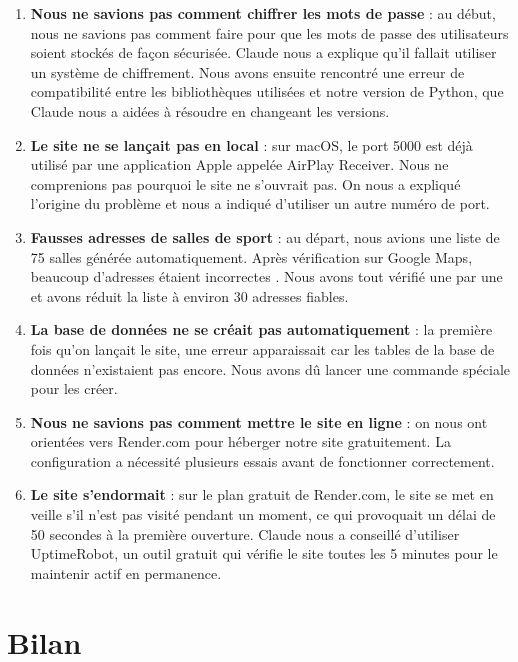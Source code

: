 \documentclass[a4paper, 12pt, twoside]{article}
\begin{document}
\begin{enumerate}
    \item \textbf{Nous ne savions pas comment chiffrer les mots de passe} : au début, nous ne savions pas comment faire pour que les mots de passe des utilisateurs soient stockés de façon sécurisée. Claude nous a explique qu'il fallait utiliser un système de chiffrement. Nous avons ensuite rencontré une erreur de compatibilité entre les bibliothèques utilisées et notre version de Python, que Claude nous a aidées à résoudre en changeant les versions.

    \item \textbf{Le site ne se lançait pas en local} : sur macOS, le port 5000  est déjà utilisé par une application Apple appelée AirPlay Receiver. Nous ne comprenions pas pourquoi le site ne s'ouvrait pas. On nous a expliqué l'origine du problème et nous a indiqué d'utiliser un autre numéro de port.

    \item \textbf{Fausses adresses de salles de sport} : au départ, nous avions une liste de 75 salles générée automatiquement. Après vérification sur Google Maps, beaucoup d'adresses étaient incorrectes . Nous avons tout vérifié une par une et avons réduit la liste à environ 30 adresses fiables.

    \item \textbf{La base de données ne se créait pas automatiquement} : la première fois qu'on lançait le site, une erreur apparaissait car les tables de la base de données n'existaient pas encore. Nous avons dû lancer une commande spéciale pour les créer.

    \item \textbf{Nous ne savions pas comment mettre le site en ligne} : on nous ont orientées vers Render.com pour héberger notre site gratuitement. La configuration a nécessité plusieurs essais avant de fonctionner correctement.

    \item \textbf{Le site s'endormait} : sur le plan gratuit de Render.com, le site se met en veille s'il n'est pas visité pendant un moment, ce qui provoquait un délai de 50 secondes à la première ouverture. Claude nous a conseillé d'utiliser UptimeRobot, un outil gratuit qui vérifie le site toutes les 5 minutes pour le maintenir actif en permanence.
\end{enumerate}

\section{Bilan}
\end{document}
